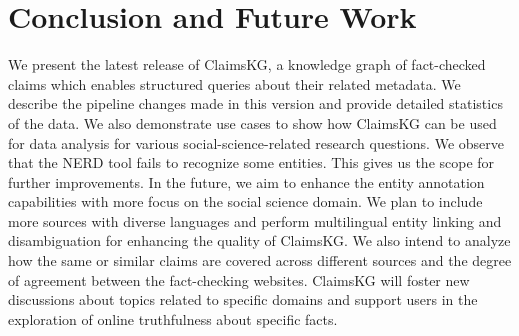 \documentclass[
]{ceurart}
\begin{document}
\section{Conclusion and Future Work}
\vspace{-2mm}
We present the latest release of ClaimsKG, a knowledge graph of fact-checked claims which enables structured queries about their related metadata. We describe the pipeline changes made in this version and provide detailed statistics of the data. We also demonstrate use cases to show how 
ClaimsKG can be used for data analysis for various social-science-related research questions. %
We observe that the NERD tool fails to recognize some entities. This gives us the scope for further improvements. In the future, we aim to enhance the entity annotation capabilities with more focus on the social science domain.
We plan to include more sources with diverse languages and perform multilingual entity linking and disambiguation for enhancing the quality of ClaimsKG. We also intend to analyze how the same or similar claims are covered across different sources and the degree of agreement between the fact-checking websites. ClaimsKG will foster new discussions about topics related to specific domains and support users in the exploration of online truthfulness about specific facts. 
\vspace{-6mm}

\end{document}
